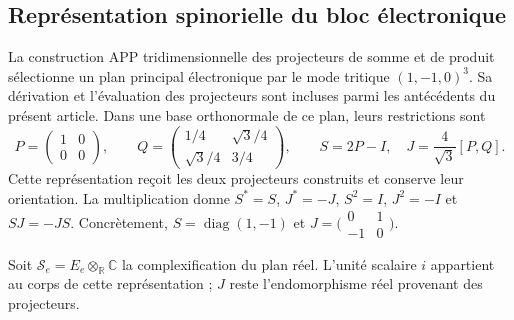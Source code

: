 \subsection{Représentation spinorielle du bloc électronique}
\label{vi:vi:subsec:spin-electron}

La construction APP tridimensionnelle des projecteurs de somme et de
produit sélectionne un plan principal électronique par le mode
tritique $(1,-1,0)^3$. Sa dérivation et l’évaluation des
projecteurs sont incluses parmi les antécédents du présent
article. Dans une base orthonormale de ce plan, leurs restrictions
sont
\begin{equation}
 P=\begin{pmatrix}1&0\\0&0\end{pmatrix},\qquad
 Q=\begin{pmatrix}1/4&\sqrt3/4\\\sqrt3/4&3/4\end{pmatrix},
 \qquad S=2P-I,\quad J=\frac4{\sqrt3}[P,Q].
 \label{vi:vi:eq:bloque-electronico}
\end{equation}
Cette représentation reçoit les deux projecteurs construits et
conserve leur orientation. La multiplication donne
$S^*=S$, $J^*=-J$, $S^2=I$, $J^2=-I$ et $SJ=-JS$.
Concrètement, $S=\operatorname{diag}(1,-1)$ et
$J=\bigl(\begin{smallmatrix}0&1\\-1&0\end{smallmatrix}\bigr)$.

Soit $\mathscr S_e=E_e\otimes_{\mathbb R}\mathbb C$ la
complexification du plan réel. L’unité scalaire $i$ appartient
au corps de cette représentation ; $J$ reste
l’endomorphisme réel provenant des projecteurs.

